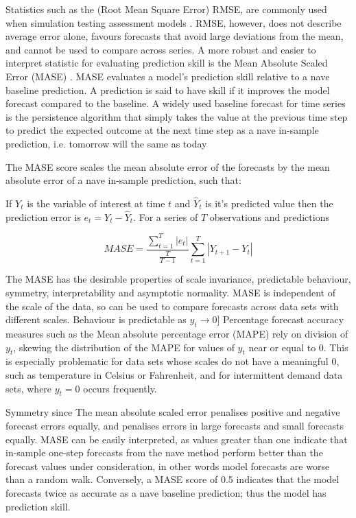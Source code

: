 

Statistics such as the (Root Mean Square Error) RMSE, are commonly used when simulation testing assessment models \citep[e.g.][]{horbowy2011,kell2016xval}. RMSE, however, does not describe average error alone, favours forecasts that avoid large deviations from the mean, and cannot be used to compare across series. A more robust and easier to interpret statistic for evaluating prediction skill is the Mean Absolute Scaled Error (MASE) \citep{Hyndman2006}. MASE evaluates a model’s prediction skill relative to a nave baseline prediction. A prediction is said to have skill if it improves the model forecast compared to the baseline. A widely used baseline forecast for time series is the persistence algorithm that simply takes the value at the previous time step to predict the expected outcome at the next time step as a nave in-sample prediction, i.e. tomorrow will the same as today 

The MASE score scales the mean absolute error of the forecasts by the mean absolute error of a nave in-sample prediction, such that:

If $Y_t$ is the variable of interest at time $t$ and ${\hat{Y}_t}$ is it's predicted value then the prediction error is $e_t = Y_t - \hat{Y}_t$. For a series of $T$ observations and predictions

\begin{equation} {MASE={\frac{\sum _{t=1}^{T}\left|e_{t}\right|}{\frac {T}{T-1}}\sum _{t=1}^{T}\left|Y_{t+1}-Y_{t}\right|}} \end{equation}

The MASE has the desirable properties of scale invariance, predictable behaviour, symmetry, interpretability and asymptotic normality. MASE is independent of the scale of the data, so can be used to compare forecasts across data sets with different scales. Behaviour is predictable as $y_{t}\rightarrow 0$] Percentage forecast accuracy measures such as the Mean absolute percentage error (MAPE) rely on division of $y_{t}$, skewing the distribution of the MAPE for values of $y_{t}$ near or equal to 0. This is especially problematic for data sets whose scales do not have a meaningful 0, such as temperature in Celsius or Fahrenheit, and for intermittent demand data sets, where $y_{t}=0$  occurs frequently.

Symmetry since The mean absolute scaled error penalises positive and negative forecast errors equally, and penalises errors in large forecasts and small forecasts equally. MASE can be easily interpreted, as values greater than one indicate that in-sample one-step forecasts from the nave method perform better than the forecast values under consideration, in other words model forecasts are worse than a random walk. Conversely, a MASE score of 0.5 indicates that the model forecasts twice as accurate as a nave baseline prediction; thus the model has prediction skill.  


